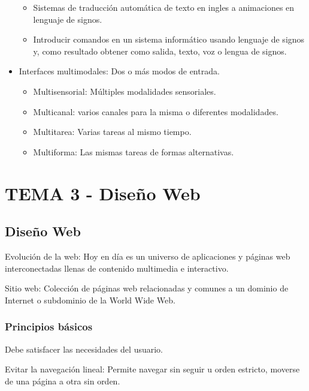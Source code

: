 \documentclass[12pt, twoside, openright]{report} %
\begin{document}
\begin{itemize}
	      \begin{itemize}
		      \item Sistemas de traducción automática de texto en ingles a animaciones
		            en lenguaje de signos.

		      \item Introducir comandos en un sistema informático usando lenguaje de
		            signos y, como resultado obtener como salida, texto, voz o lengua
		            de signos.
	      \end{itemize}
	\item Interfaces multimodales: Dos o más modos de entrada.

	      \begin{itemize}
		      \item Multisensorial: Múltiples modalidades sensoriales.

		      \item Multicanal: varios canales para la misma o diferentes modalidades.

		      \item Multitarea: Varias tareas al mismo tiempo.

		      \item Multiforma: Las mismas tareas de formas alternativas.
	      \end{itemize}
\end{itemize}

\chapter{TEMA 3 - Diseño Web}
\section{Diseño Web}

Evolución de la web: Hoy en día es un universo de aplicaciones y
páginas web interconectadas llenas de contenido multimedia e
interactivo.

Sitio web: Colección de páginas web relacionadas y comunes a un
dominio de Internet o subdominio de la World Wide Web.

\subsection{Principios básicos}


Debe satisfacer las necesidades del usuario.

Evitar la navegación lineal: Permite navegar sin seguir u orden
estricto, moverse de una página a otra sin orden.
\end{document}
